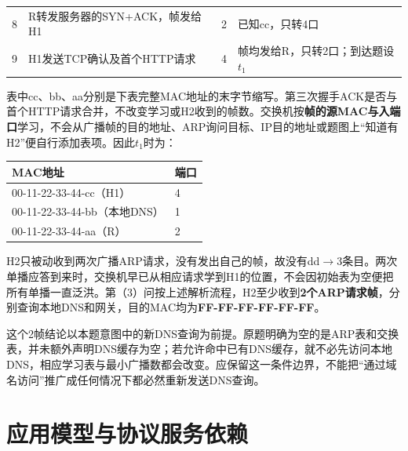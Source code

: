 \begin{wideblock}
\begin{minipage}{\linewidth}
\begin{tabularx}{\linewidth}{@{}YYYY@{}}
8 & R转发服务器的SYN+ACK，帧发给H1 & 2 & 已知cc，只转4口 \\
9 & H1发送TCP确认及首个HTTP请求 & 4 & 帧均发给R，只转2口；到达题设\(t_1\) \\
\bottomrule\end{tabularx}
\end{minipage}\par\medskip

\end{wideblock}

表中cc、bb、aa分别是下表完整MAC地址的末字节缩写。第三次握手ACK是否与首个HTTP请求合并，不改变学习或H2收到的帧数。交换机按\textbf{帧的源MAC与入端口}学习，不会从广播帧的目的地址、ARP询问目标、IP目的地址或题图上``知道有H2''便自行添加表项。因此\(t_1\)时为：

\begin{wideblock}

\par\medskip\noindent\begin{minipage}{\linewidth}\fontsize{9.3}{12}\selectfont\begin{tabularx}{\linewidth}{@{}YY@{}}
\toprule\noalign{}
MAC地址 & 端口 \\
\midrule\noalign{}


00-11-22-33-44-cc（H1） & 4 \\
00-11-22-33-44-bb（本地DNS） & 1 \\
00-11-22-33-44-aa（R） & 2 \\
\bottomrule\end{tabularx}
\end{minipage}\par\medskip

\end{wideblock}

H2只被动收到两次广播ARP请求，没有发出自己的帧，故没有dd\ensuremath{\to}3条目。两次单播应答到来时，交换机早已从相应请求学到H1的位置，不会因初始表为空便把所有单播一直泛洪。第（3）问按上述解析流程，H2至少收到\textbf{2个ARP请求帧}，分别查询本地DNS和网关，目的MAC均为\textbf{FF-FF-FF-FF-FF-FF}。

这个2帧结论以本题意图中的新DNS查询为前提。原题明确为空的是ARP表和交换表，并未额外声明DNS缓存为空；若允许命中已有DNS缓存，就不必先访问本地DNS，相应学习表与最小广播数都会改变。应保留这一条件边界，不能把``通过域名访问''推广成任何情况下都必然重新发送DNS查询。

\section{应用模型与协议服务依赖}\label{CN06-course-model}

